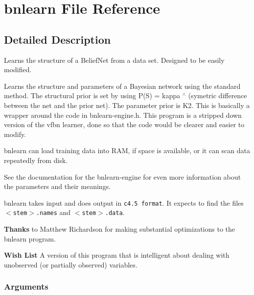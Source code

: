 \section{bnlearn File Reference}
\label{bnlearn}


\subsection{Detailed Description}
Learns the structure of a Belief\-Net from a data set. Designed to be easily modified. 

Learns the structure and parameters of a Bayesian network using the standard method. The structural prior is set by using P(S) = kappa $^\wedge$ (symetric difference between the net and the prior net). The parameter prior is K2. This is basically a wrapper around the code in bnlearn-engine.h. This program is a stripped down version of the vfbn learner, done so that the code would be clearer and easier to modify.

bnlearn can load training data into RAM, if space is available, or it can scan data repeatedly from disk.

See the documentation for the bnlearn-engine for even more information about the parameters and their meanings.

bnlearn takes input and does output in {\tt c4.5 format}. It expects to find the files {\tt $<$stem$>$.names} and {\tt $<$stem$>$.data}.

\begin{Desc}
\item[{\bf Thanks}]to Matthew Richardson for making substantial optimizations to the bnlearn program. \end{Desc}


\begin{Desc}
\item[{\bf Wish List}]A version of this program that is intelligent about dealing with unobserved (or partially observed) variables. \end{Desc}
\subsubsection*{Arguments}

